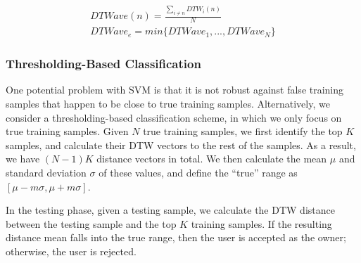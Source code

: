 \begin{eqnarray}
DTWave(n) = \frac{\sum_{i\neq{n}}DTW_i(n)}{N} \\
DTWave_e = min\{DTWave_1,...,DTWave_N\}
\label{eq:top1}
\end{eqnarray}




\subsubsection{Thresholding-Based Classification}

One potential problem with SVM is that it is not robust against false training samples that happen to be close to true training samples. Alternatively, we consider a thresholding-based classification scheme, in which we only focus on true training samples. Given $N$ true training samples, we first identify the top $K$ samples, and calculate their DTW vectors to the rest of the samples. As a result, we have $(N-1)K$ distance vectors in total. We then calculate the mean $\mu$ and standard deviation $\sigma$ of these values, and define the ``true'' range as $[\mu-m\sigma, \mu+m\sigma]$.

In the testing phase, given a testing sample, we calculate the DTW distance between the testing sample and the top $K$ training samples. If the resulting distance mean falls into the true range, then the user is accepted as the owner; otherwise, the user is rejected.

